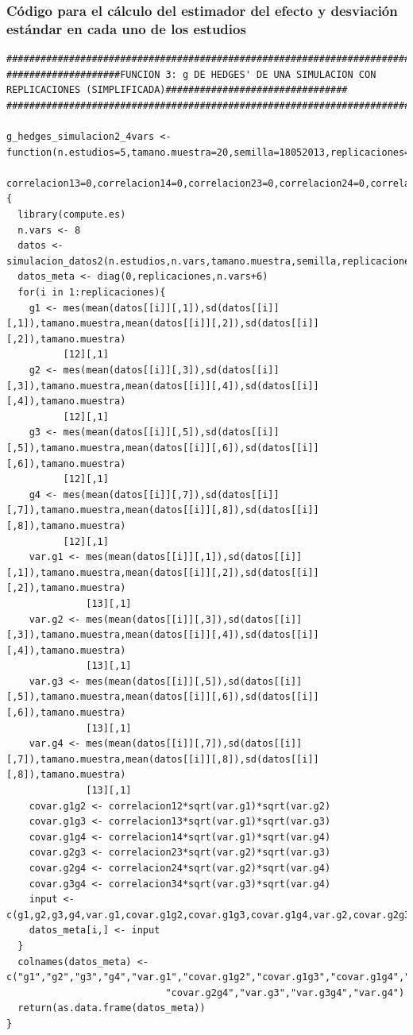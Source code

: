 \documentclass[a4paper,openright,12pt]{report}
\begin{document}
\subsubsection{Código para el cálculo del estimador del efecto y desviación estándar en cada uno de los estudios}
{\tiny
\begin{verbatim}
##############################################################################################################################
####################FUNCION 3: g DE HEDGES' DE UNA SIMULACION CON REPLICACIONES (SIMPLIFICADA)################################
##############################################################################################################################

g_hedges_simulacion2_4vars <- function(n.estudios=5,tamano.muestra=20,semilla=18052013,replicaciones=5,correlacion12=0,
                                       correlacion13=0,correlacion14=0,correlacion23=0,correlacion24=0,correlacion34=0){
  library(compute.es)
  n.vars <- 8
  datos <- simulacion_datos2(n.estudios,n.vars,tamano.muestra,semilla,replicaciones) 
  datos_meta <- diag(0,replicaciones,n.vars+6)
  for(i in 1:replicaciones){
    g1 <- mes(mean(datos[[i]][,1]),sd(datos[[i]][,1]),tamano.muestra,mean(datos[[i]][,2]),sd(datos[[i]][,2]),tamano.muestra)
          [12][,1]
    g2 <- mes(mean(datos[[i]][,3]),sd(datos[[i]][,3]),tamano.muestra,mean(datos[[i]][,4]),sd(datos[[i]][,4]),tamano.muestra)
          [12][,1]
    g3 <- mes(mean(datos[[i]][,5]),sd(datos[[i]][,5]),tamano.muestra,mean(datos[[i]][,6]),sd(datos[[i]][,6]),tamano.muestra)
          [12][,1]
    g4 <- mes(mean(datos[[i]][,7]),sd(datos[[i]][,7]),tamano.muestra,mean(datos[[i]][,8]),sd(datos[[i]][,8]),tamano.muestra)
          [12][,1]
    var.g1 <- mes(mean(datos[[i]][,1]),sd(datos[[i]][,1]),tamano.muestra,mean(datos[[i]][,2]),sd(datos[[i]][,2]),tamano.muestra)
              [13][,1]
    var.g2 <- mes(mean(datos[[i]][,3]),sd(datos[[i]][,3]),tamano.muestra,mean(datos[[i]][,4]),sd(datos[[i]][,4]),tamano.muestra)
              [13][,1]
    var.g3 <- mes(mean(datos[[i]][,5]),sd(datos[[i]][,5]),tamano.muestra,mean(datos[[i]][,6]),sd(datos[[i]][,6]),tamano.muestra)
              [13][,1]
    var.g4 <- mes(mean(datos[[i]][,7]),sd(datos[[i]][,7]),tamano.muestra,mean(datos[[i]][,8]),sd(datos[[i]][,8]),tamano.muestra)
              [13][,1]
    covar.g1g2 <- correlacion12*sqrt(var.g1)*sqrt(var.g2)
    covar.g1g3 <- correlacion13*sqrt(var.g1)*sqrt(var.g3)
    covar.g1g4 <- correlacion14*sqrt(var.g1)*sqrt(var.g4)
    covar.g2g3 <- correlacion23*sqrt(var.g2)*sqrt(var.g3)
    covar.g2g4 <- correlacion24*sqrt(var.g2)*sqrt(var.g4)
    covar.g3g4 <- correlacion34*sqrt(var.g3)*sqrt(var.g4)
    input <- c(g1,g2,g3,g4,var.g1,covar.g1g2,covar.g1g3,covar.g1g4,var.g2,covar.g2g3,covar.g2g4,var.g3,covar.g3g4,var.g4)
    datos_meta[i,] <- input
  }
  colnames(datos_meta) <- c("g1","g2","g3","g4","var.g1","covar.g1g2","covar.g1g3","covar.g1g4","var.g2","covar.g2g3",
                            "covar.g2g4","var.g3","var.g3g4","var.g4")
  return(as.data.frame(datos_meta))
}


\end{verbatim}}
\end{document}
